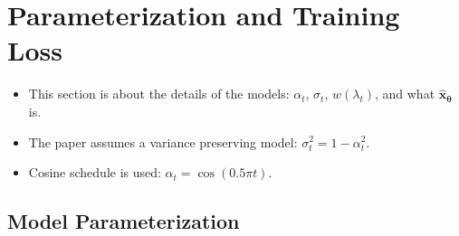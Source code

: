 \documentclass[10pt]{article}
\newcommand{\ve}[1]{\mathbf{#1}}
\newcommand{\ves}[1]{\boldsymbol{#1}}
\begin{document}
\section{Parameterization and Training Loss}

\begin{itemize}
  \item This section is about the details of the models: $\alpha_t$, $\sigma_t$, $w(\lambda_t)$, and what $\hat{\ve{x}}_{\ves{\theta}}$ is.
  
  \item The paper assumes a variance preserving model: $\sigma_t^2 = 1 - \alpha_t^2$.
  
  \item Cosine schedule is used: $\alpha_t = \cos(0.5 \pi t)$.  
\end{itemize}

\subsection{Model Parameterization}
\end{document}
